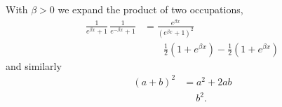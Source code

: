 \documentclass{article}
\begin{document}
With $\beta>0$ we expand the product of two occupations,
\begin{align}
\frac{1}{e^{\beta x}+1}\,\frac{1}{e^{-\beta x}+1} &= \frac{e^{\beta x}}{\left(e^{\beta x}+1\right)^2} \nonumber\\
&\qquad \frac{1}{2}\left(1 + e^{\beta x}\right) - \frac{1}{2}\left(1+e^{\beta x}\right) \label{eq:cont}
\end{align}
and similarly
\begin{align}
\left(a + b\right)^2 &= a^2 + 2ab \nonumber\\
& \quad\; b^2 . \label{eq:sq}
\end{align}
\end{document}
